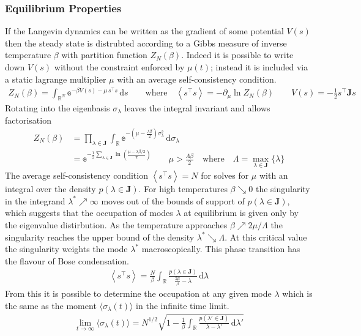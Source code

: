 \documentclass{article}[12pt]
\numberwithin{equation}{section}
\begin{document}
\subsubsection{Equilibrium Properties}
If the Langevin dynamics can be written as the gradient of some potential $V(s)$
then the steady state is distrubted according to a Gibbs measure of inverse
temperature $\beta$ with partition function $Z_N(\beta)$.
Indeed it is possible to write down $V(s)$ without the constraint enforced by
$\mu(t)$; instead it is included via a static lagrange multiplier $\mu$ with
an average self-consistency condition.
\begin{align}
  Z_N(\beta)=\int_{\mathbb{R}^N}\!\mathbb{e}^{-\beta V(s)-\mu\,s^{\top}\!s}\,\mathrm{d}s
  \qquad\text{where}\quad
  \left\langle s^\top\!s\right\rangle=-\partial_\mu\ln Z_N(\beta)
  \qquad
  V(s)=-\frac{1}{2}s^{\top}\mathbf{J}s
\end{align}
Rotating into the eigenbasis $\sigma_\lambda$ leaves the integral invariant and
allows factorisation
\begin{align}
  Z_N(\beta)
  &= \prod_{\lambda\in\mathbf{J}}
    \int_{\mathbb{R}}
      \mathbb{e}^{-(\mu-\frac{\lambda\beta}{2})\sigma_\lambda^2}
    \,\mathrm{d}\sigma_\lambda \\
  &= \mathbb{e}^{-\frac{1}{2}\sum_{\lambda\in\mathbf{J}}\ln\left(\frac{\mu-\lambda\beta/2}{\pi}\right)}
  \qquad\mu>\frac{\Lambda\beta}{2}
  \quad\text{where}\quad
  \Lambda=\max_{\lambda\in\mathbf{J}}\{\lambda\}
\end{align}
The average self-consistency condition $\left\langle s^\top\!s\right\rangle=N$ for
solves for $\mu$ with an integral over the density $p(\lambda\in\mathbf{J})$.
For high temperatures $\beta\searrow 0$ the singularity in the integrand
$\lambda^*\nearrow\infty$ moves out of the bounds of support of
$p(\lambda\in\mathbf{J})$, which suggests that the occupation of modes $\lambda$
at equilibrium is given only by the eigenvalue distirbution. As the temperature
approaches $\beta\nearrow 2\mu/\Lambda$ the singularity reaches the upper
bound of the density $\lambda^*\searrow\Lambda$. At this critical value the
singularity weights the mode $\lambda^*$ macroscopically. This phase transition
has the flavour of Bose condensation.
\begin{align}
  \left\langle s^\top\!s\right\rangle
  =\frac{N}{\beta}\int_{\mathbb{R}}\frac{p(\lambda\in\mathbf{J})}{\frac{2\mu}{\beta}-\lambda}\,\mathrm{d}\lambda
\end{align}
From this it is possible to determine the occupation at any given mode $\lambda$
which is the same as the moment $\langle \sigma_{\lambda}(t)\rangle$ in the
infinite time limit.
\begin{align}
  \lim_{t\rightarrow\infty}\langle \sigma_{\lambda}(t)\rangle
  =N^{1/2}\sqrt{1-\frac{1}{\beta}\int_{\mathbb{R}}
  \frac{p(\lambda'\in\mathbf{J})}{\lambda-\lambda'}\,\mathrm{d}\lambda'}
  \label{eq:equilibrium}
\end{align}
\pagebreak
\end{document}
